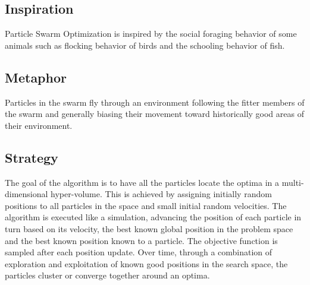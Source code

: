 \subsection{Inspiration}
Particle Swarm Optimization is inspired by the social foraging behavior of some animals such as flocking behavior of birds and the schooling behavior of fish.

\subsection{Metaphor}
Particles in the swarm fly through an environment following the fitter members of the swarm and generally biasing their movement toward historically good areas of their environment.

\subsection{Strategy}
The goal of the algorithm is to have all the particles locate the optima in a multi-dimensional hyper-volume.
This is achieved by assigning initially random positions to all particles in the space and small initial random velocities. The algorithm is executed like a simulation, advancing the position of each particle in turn based on its velocity, the best known global position in the problem space and the best known position known to a particle. The objective function is sampled after each position update. Over time, through a combination of exploration and exploitation of known good positions in the search space, the particles cluster or converge together around an optima.

